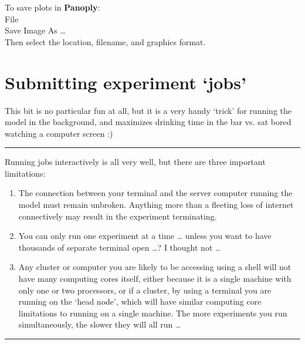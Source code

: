 \documentclass[11pt,fleqn]{book} %
\begin{document}
\noindent To save plots in \textbf{Panoply}:
\small
\\\textsf{File}
\\\textsf{Save Image As …}
\normalsize
\\Then select the location, filename, and graphics format.


\newpage


\section{Submitting experiment ‘jobs’}

This bit is no particular fun at all, but it is a very handy ‘trick’ for running the model in the background, and maximizes drinking time in the bar vs. sat bored watching a computer screen :)

\vspace{1mm}
\noindent\rule{4cm}{0.1mm}
\vspace{2mm}

\noindent Running jobs interactively is all very well, but there are three important limitations:
\begin{enumerate}[noitemsep]
\vspace{1mm}
\item The connection between your terminal and the server computer running the model must remain unbroken. Anything more than a fleeting loss of internet connectively may result in the experiment terminating.
\vspace{1mm}
\item You can only run one experiment at a time … unless you want to have thousands of separate terminal open …? I thought not …
\vspace{1mm}
\item Any cluster or computer you are likely to be accessing using a shell will not have many computing cores itself, either because it is a single machine with only one or two processors, or if a cluster, by using a terminal you are running on the ‘head node’, which will have similar computing core limitations to running on a single machine. The more experiments you run simultaneously, the slower they will all run …
\end{enumerate}

\vspace{1mm}
\noindent\rule{4cm}{0.1mm}
\vspace{2mm}
\end{document}
